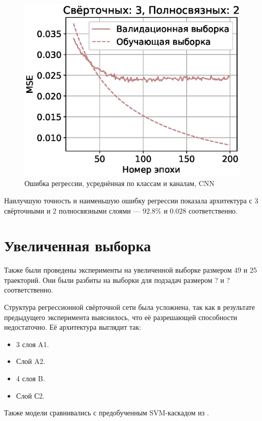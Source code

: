 \documentclass[12pt,twoside]{article}
\begin{document}
\begin{figure}[H]
    \includegraphics[scale=0.44]{charts/cnn32_mse.eps}
    \centering
    \caption{Ошибка регрессии, усреднённая по классам и каналам, CNN}
\end{figure}

Наилучшую точность и наименьшую ошибку регрессии показала архитектура с 3 свёрточными и 2 полносвязными слоями --- $92.8\%$ и $0.028$ соответственно.

\section{Увеличенная выборка}

Также были проведены эксперименты на увеличенной выборке размером 49 и 25 траекторий. Они были разбиты 
на выборки для подзадач размером ? и ? соответственно.

Структура регрессионной свёрточной сети была усложнена, так как в результате предыдущего эксперимента выяснилось, что её разрешающей способности недостаточно. Её архитектура выглядит так:
\begin{itemize}
    \item 3 слоя A1.
    \item Слой A2.
    \item 4 слоя B.
    \item Слой С2.
\end{itemize}

Также модели сравнивались с предобученным SVM-каскадом из \cite{journals/corr/abs-1712-09004}. 
\end{document}
